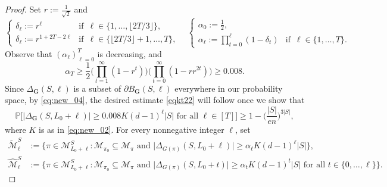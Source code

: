 \documentclass[10pt,a4paper]{amsart}
\begin{document}
\begin{proof}
Set $r:=\frac{1}{\sqrt{2}}$ and
\begin{equation} \label{e-pap-p3}
\begin{cases}
\delta_\ell := r^{\ell} & \text{if } \, \ell\in \big\{1,\dots,\lfloor 2T/3 \rfloor\big\}, \\
\delta_\ell :=  r^{1+2T-2\ell} & \text{if } \, \ell\in \big\{ \lfloor 2T/3 \rfloor+1,\dots,T\big\},
\end{cases}
\ \ \ \
\begin{cases}
\alpha_0:=\frac{1}{2}, \\
\alpha_\ell := \prod_{t=0}^{\ell}(1-\delta_t) & \text{if } \, \ell\in \{1,\dots,T\}.
\end{cases}
\end{equation}
Observe that $(\alpha_\ell)_{\ell=0}^T$ is decreasing, and
\begin{equation} \label{"douleia"}
\alpha_T\geqslant \frac{1}{2}\Big(\prod_{t=1}^{\infty}(1-r^t)\Big)
\Big(\prod_{t=0}^{\infty}(1-r r^{2t})\Big) \geqslant 0.008.
\end{equation}
Since $\Delta_{\mathbf{G}}(S,\ell)$ is a subset of $\partial B_{\mathbf{G}}(S,\ell)$ everywhere
in our probability space, by \eqref{eq:new_04}, the desired estimate \eqref{eqkt22} will follow once we show that
\begin{equation} \label{eqkt23}
\mathbb{P}\Big[ \big|\Delta_{\mathbf{G}}(S,L_0+\ell)\big| \geqslant
0.008 K (d-1)^\ell |S| \text{ for all } \ell\in [T]\Big]\geqslant 1- \Big(\frac{|S|}{en}\Big)^{3|S|},
\end{equation}
where $K$ is as in \eqref{eq:new_02}. For every nonnegative integer $\ell$, set
\begin{align*}
\widetilde{\mathcal{M}}^S_\ell & := \big\{ \pi\in\mathcal{M}^S_{L_0+\ell}\colon
\mathcal{M}_{\pi_0}\subseteq\mathcal{M}_\pi\text{ and }
\big| \Delta_{G(\pi)}(S,L_0+\ell)\big| \geqslant \alpha_\ell K (d-1)^\ell|S|\big\}, \\
\widehat{\mathcal{M}}^S_\ell & := \big\{\pi\in\mathcal{M}^S_{L_0+\ell} \colon
\mathcal{M}_{\pi_0}\subseteq\mathcal{M}_\pi\text{ and }
\big|\Delta_{G(\pi)}(S,L_0+t)\big| \geqslant \alpha_t K (d-1)^t|S| \text{ for all } t\in\{0,\dots,\ell\}\big\}.
\end{align*}

\end{proof}
\end{document}
